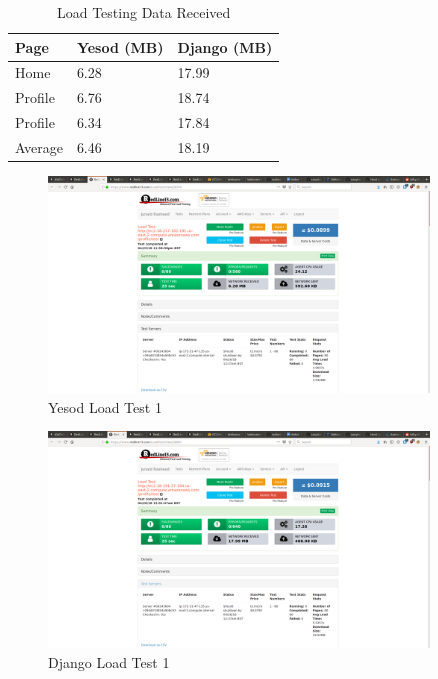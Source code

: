 \begin{table}[H]
	\caption{Load Testing Data Received}
	\begin{center}
		\begin{tabular}{ | l | l | l |}
			\hline
			Page & Yesod (MB) & Django (MB) \\
			\hline
			Home & 6.28 & 17.99 \\
			Profile & 6.76 & 18.74 \\
			Profile & 6.34 & 17.84 \\
			Average & 6.46 & 18.19 \\
			\hline
		\end{tabular}
	\end{center}
	\label{tab:dataTests}
\end{table}

\begin{figure}[H]
	\centering
	\includegraphics[width=0.9\textwidth]{final_report/pics/yesodLoadTest1.png}
	\caption{Yesod Load Test 1}
	\label{fig:yesodLoadTest1}
\end{figure}

\begin{figure}[H]
	\centering
	\includegraphics[width=0.9\textwidth]{final_report/pics/djangoLoadTest1.png}
	\caption{Django Load Test 1}
	\label{fig:djangoLoadTest1}
\end{figure}

